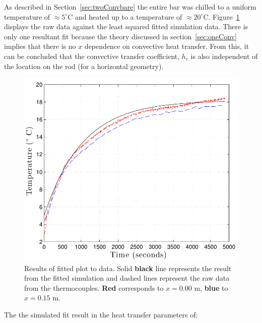 \documentclass[10pt,aps,prb,twocolumn, nofootinbib]{revtex4-1}
\begin{document}
As described in Section~\ref{sec:twoConvbare} the entire bar was chilled to a uniform temperature of $\approx 5^\circ \text{C}$ and heated up to a temperature of $\approx 20^\circ \text{C}$. Figure~\ref{fig:bareHeating} displays the raw data against the least squared fitted simulation data. There is only one resultant fit because the theory discussed in section~\ref{sec:oneConv} implies that there is no $x$ dependence on convective heat transfer. From this, it can be concluded that the convective transfer coefficient, $h_c$ is also independent of the location on the rod (for a horizontal geometry).  

\begin{figure}[h]
\centering
\includegraphics[width=1.0\linewidth]{bareHeating}
\caption{Results of fitted plot to data. Solid \textbf{black} line represents the result from the fitted simulation and dashed lines represent the raw data from the thermocouples. {\color{red}\textbf{Red}} corresponds to $x = 0.00$ m, {\color{blue}\textbf{blue}} to $x = 0.15$ m.}
\label{fig:bareHeating}
\end{figure}
 The the simulated fit result in the heat transfer parameters of:
\begin{center}
\end{center}
\end{document}
